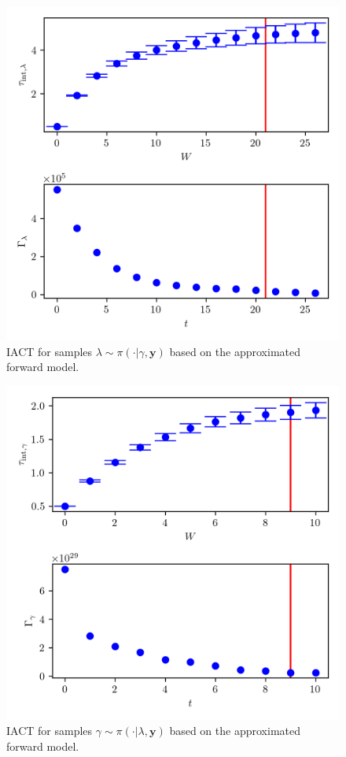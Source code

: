 \begin{figure}[ht!]
	\centering
	\includegraphics{UwerrTauIntSecO3lam.png}
	\caption[IACT and autocorrelation function for samples $\lambda \sim \pi{\cdot | \gamma, \bm{y}}$.]{IACT for samples $\lambda \sim \pi( \cdot | \gamma, \bm{y})$ based on the approximated forward model.}
	\label{fig:IATCSecO3lam}
\end{figure}
\begin{figure}[ht!]
	\centering
	\includegraphics{UwerrTauIntSecO3gam.png}
	\caption[IACT and autocorrelation function for samples $\gamma \sim \pi( \cdot | \lambda, \bm{y})$]{IACT for samples $\gamma \sim \pi( \cdot | \lambda, \bm{y})$ based on the approximated forward model.}
	\label{fig:IATCSecO3gam}
\end{figure}
